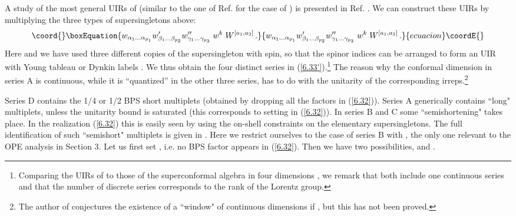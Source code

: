 \documentclass[a4paper,11pt]{article}
\begin{document}
A study of the most general UIRs of \coordHE{} (similar to the one
of Ref. \cite{dp} for the case of \coordHE{}) is presented in Ref.
\cite{Minw2}. We can construct these UIRs by multiplying the three types of
supersingletons above:
\begin{equation}\coord{}\boxEquation{\label{6.32}
  w_{\alpha_1\ldots\alpha_{p_1}}w'_{\beta_1\ldots\beta_{p_2}}
w''_{\gamma_1\ldots\gamma_{p_3}}\; w^k\; W^{[a_1,a_2]}\,.
}{w_{\alpha_1\ldots\alpha_{p_1}}w'_{\beta_1\ldots\beta_{p_2}}
w''_{\gamma_1\ldots\gamma_{p_3}}\; w^k\; W^{[a_1,a_2]}\,.
}{ecuacion}\coordE{}\end{equation}
Here \coordHE{} and we have used three different copies of the
supersingleton with spin, so that the spinor indices can be arranged to form an
\coordHE{} UIR with Young tableau \coordHE{} or Dynkin labels
\coordHE{}. We thus obtain the four distinct series in
(\ref{6.33'}).\footnote{Comparing the UIRs of \coordHE{} to those
of the \coordHE{} superconformal algebra in four dimensions \coordHE{}
\cite{dp}, we remark that both include one continuous series and that the
number
of discrete series corresponds to the rank of the Lorentz group.} The reason
why the conformal dimension in series A is continuous, while it is
``quantized'' in the other three
series, has to do with the unitarity of the corresponding
irreps.\footnote{The author of \cite{Minw2} conjectures the existence of a
``window" of continuous dimensions \coordHE{} if \coordHE{}, but this has not been proved.}

Series D contains the 1/4 or 1/2 BPS short multiplets (obtained by dropping all
the \coordHE{} factors in (\ref{6.32})). Series A generically contains ``long"
multiplets, unless the unitarity bound is saturated \cite{Minw2} (this
corresponds to setting \coordHE{} in (\ref{6.32})). In series B and C some
``semishortening" takes place. In the realization (\ref{6.32}) this is easily
seen by using the on-shell constraints on the elementary supersingletons. The
full identification of such ``semishort" multiplets is given in \cite{FS1}.
Here we restrict ourselves to the case of series B with \coordHE{}, the only one
relevant to the OPE analysis in Section 3. Let us first set \coordHE{}, i.e.
no BPS factor appears in (\ref{6.32}). Then we have two possibilities, \coordHE{} and \coordHE{}.
\end{document}
